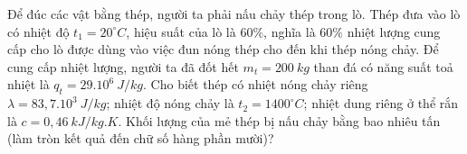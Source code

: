 \begin{ex}%
	Để đúc các vật bằng thép, người ta phải nấu chảy thép trong lò. Thép đưa vào lò có nhiệt độ $t_1 = 20^\circ C$, hiệu suất của lò là $60\%$, nghĩa là $60\%$ nhiệt lượng cung cấp cho lò được dùng vào việc đun nóng thép cho đến khi thép nóng chảy. Để cung cấp nhiệt lượng, người ta đã đốt hết $m_t = 200\ kg$ than đá có năng suất toả nhiệt là $q_t = 29.10^6\ J/kg$. Cho biết thép có nhiệt nóng chảy riêng $\lambda = 83,7.10^3\ J/kg$; nhiệt độ nóng chảy là $t_2 = 1400^\circ C$; nhiệt dung riêng ở thể rắn là $c = 0,46\ kJ/kg.K$. Khối lượng của mẻ thép bị nấu chảy bằng bao nhiêu tấn (làm tròn kết quả đến chữ số hàng phần mười)?
\end{ex}
